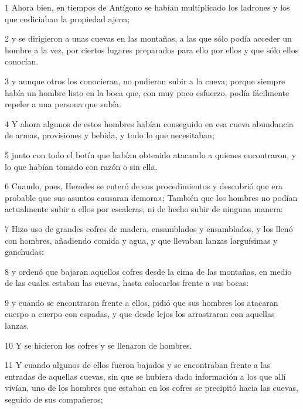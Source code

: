 \par 1 Ahora bien, en tiempos de Antígono se habían multiplicado los ladrones y los que codiciaban la propiedad ajena;

\par 2 y se dirigieron a unas cuevas en las montañas, a las que sólo podía acceder un hombre a la vez, por ciertos lugares preparados para ello por ellos y que sólo ellos conocían.

\par 3 y aunque otros los conocieran, no pudieron subir a la cueva; porque siempre había un hombre listo en la boca que, con muy poco esfuerzo, podía fácilmente repeler a una persona que subía.

\par 4 Y ahora algunos de estos hombres habían conseguido en esa cueva abundancia de armas, provisiones y bebida, y todo lo que necesitaban;

\par 5 junto con todo el botín que habían obtenido atacando a quienes encontraron, y lo que habían tomado con razón o sin ella.

\par 6 Cuando, pues, Herodes se enteró de sus procedimientos y descubrió que era probable que sus asuntos causaran demora»; También que los hombres no podían actualmente subir a ellos por escaleras, ni de hecho subir de ninguna manera:

\par 7 Hizo uso de grandes cofres de madera, ensamblados y ensamblados, y los llenó con hombres, añadiendo comida y agua, y que llevaban lanzas larguísimas y ganchudas:

\par 8 y ordenó que bajaran aquellos cofres desde la cima de las montañas, en medio de las cuales estaban las cuevas, hasta colocarlos frente a sus bocas:

\par 9 y cuando se encontraron frente a ellos, pidió que sus hombres los atacaran cuerpo a cuerpo con espadas, y que desde lejos los arrastraran con aquellas lanzas.

\par 10 Y se hicieron los cofres y se llenaron de hombres.

\par 11 Y cuando algunos de ellos fueron bajados y se encontraban frente a las entradas de aquellas cuevas, sin que se hubiera dado información a los que allí vivían, uno de los hombres que estaban en los cofres se precipitó hacia las cuevas, seguido de sus compañeros;

